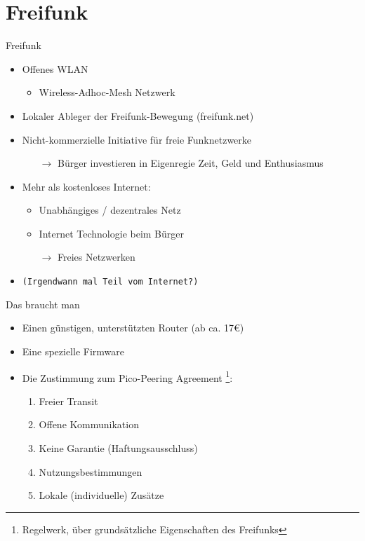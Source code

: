 \section{Freifunk}

\begin{frame}{Freifunk}
    \begin{itemize}
        \item Offenes WLAN
        \begin{itemize}
            \item Wireless-Adhoc-Mesh Netzwerk
        \end{itemize}
        \item Lokaler Ableger der Freifunk-Bewegung (freifunk.net)
        \item Nicht-kommerzielle Initiative für freie Funknetzwerke
        \begin{itemize}
            \item[$\rightarrow$] Bürger investieren in Eigenregie Zeit, Geld und Enthusiasmus
        \end{itemize}
        \item Mehr als \glqq{}kostenloses Internet\grqq:
        \begin{itemize}
            \item Unabhängiges / dezentrales Netz
            \item Internet Technologie beim Bürger
            \item[$\rightarrow$] Freies Netzwerken
        \end{itemize}
    \item \texttt{\small{}(Irgendwann mal Teil vom Internet?)}
    \end{itemize}
\end{frame}

\begin{frame}{Das braucht man}
    \begin{itemize}
        \item Einen günstigen, unterstützten Router (ab ca. 17€)
        \item Eine spezielle Firmware
        \item Die Zustimmung zum \glqq{}Pico-Peering Agreement\grqq
            \footnote{Regelwerk, über grundsätzliche Eigenschaften des Freifunks}:
            \begin{enumerate}
                \item Freier Transit
                \item Offene Kommunikation
                \item Keine Garantie (Haftungsausschluss)
                \item Nutzungsbestimmungen
                \item Lokale (individuelle) Zusätze
            \end{enumerate}
    \end{itemize}
\end{frame}

